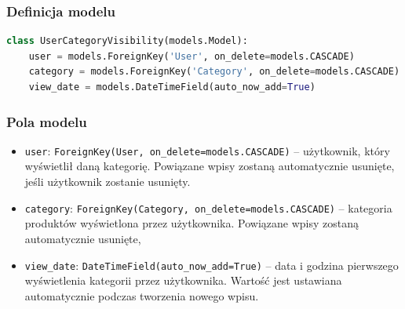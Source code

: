 \documentclass[12pt,a4paper,oneside]{article}
\theoremstyle{definition}
\numberwithin{equation}{section}
\begin{document}
\subsubsection{Definicja modelu}
\begin{lstlisting}[language=Python, caption={Model \texttt{UserCategoryVisibility}}]
class UserCategoryVisibility(models.Model):
    user = models.ForeignKey('User', on_delete=models.CASCADE)
    category = models.ForeignKey('Category', on_delete=models.CASCADE)
    view_date = models.DateTimeField(auto_now_add=True)
\end{lstlisting}

\subsubsection{Pola modelu}
\begin{itemize}
    \item \texttt{user}: \texttt{ForeignKey(User, on\_delete=models.CASCADE)} – użytkownik, który wyświetlił daną kategorię. Powiązane wpisy zostaną automatycznie usunięte, jeśli użytkownik zostanie usunięty.
    \item \texttt{category}: \texttt{ForeignKey(Category, on\_delete=models.CASCADE)} – kategoria produktów wyświetlona przez użytkownika. Powiązane wpisy zostaną automatycznie usunięte,
    \item \texttt{view\_date}: \texttt{DateTimeField(auto\_now\_add=True)} – data i godzina pierwszego wyświetlenia kategorii przez użytkownika. Wartość jest ustawiana automatycznie podczas tworzenia nowego wpisu.
\end{itemize}
\end{document}
